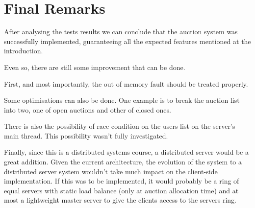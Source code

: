 \documentclass[twocolumn,10pt]{article}
\begin{document}
\section{Final Remarks}
After analysing the tests results we can conclude that the auction system was successfully implemented, guaranteeing all the expected features mentioned at the introduction.

Even so, there are still some improvement that can be done. 

First, and most importantly, the out of memory fault should be treated properly.

Some optimisations can also be done. One example is to break the auction list into two, one of open auctions and other of closed ones.

There is also the possibility of race condition on the users list on the server's main thread. This possibility wasn't fully investigated.

Finally, since this is a distributed systems course, a distributed server would be a great addition. Given the current architecture, the evolution of the system to a distributed server system wouldn't take much impact on the client-side implementation. If this was to be implemented, it would probably be a ring of equal servers with static load balance (only at auction allocation time) and at most a lightweight master server to give the clients access to the servers ring.
\end{document}
